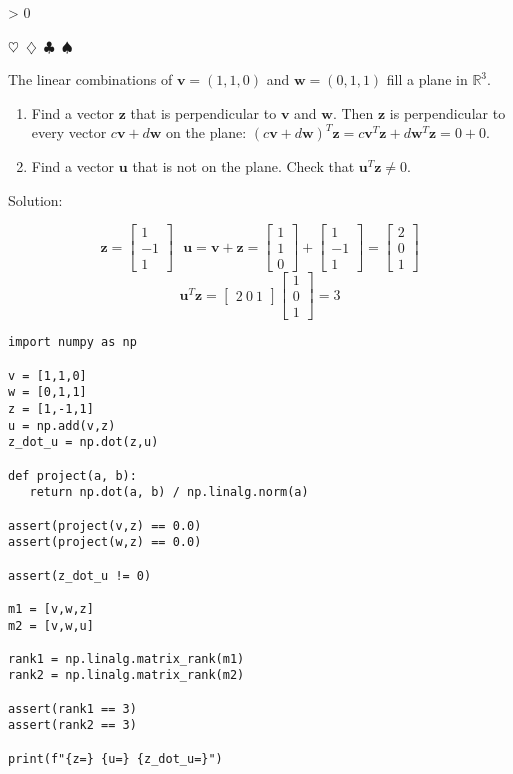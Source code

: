 \documentclass{article}
\newcommand{\sep}{\begin{center}$\heartsuit$~$\diamondsuit$~$\clubsuit$~$\spadesuit$\end{center}}
\newcommand{\sol}{\begin{center}\small{Solution:}\end{center}}
\newcommand{\vect}[1]{\ensuremath{\boldsymbol{#1}}}
\newcounter{prblm}
\newcommand{\problem}[1]{
  \begingroup
  \ifnum\value{prblm} > 0 \sep \fi
  \stepcounter{prblm}
  \noindent\textbf{\arabic{prblm}} #1
  \sol
  \endgroup
}
\begin{document}
\problem{The linear combinations of $\vect{v} = (1, 1, 0)$ and $\vect{w} = (0, 1, 1)$ fill a plane in $\mathbb{R}^3$.
\begin{enumerate}[label=(\alph*)]
\item Find a vector $\vect{z}$ that is perpendicular to $\vect{v}$ and $\vect{w}$. Then $\vect{z}$ is perpendicular to every vector $c\vect{v} + d\vect{w}$ on the plane: $(c\vect{v} + d\vect{w})^T \vect{z} = c\vect{v}^T\vect{z} + d\vect{w}^T\vect{z} = 0 + 0$. 
\item Find a vector $\vect{u}$ that is not on the plane. Check that $\vect{u}^T\vect{z} \not= 0$.
\end{enumerate}}


\begin{displaymath}
  \vect{z} = \begin{bmatrix} 1 \\ -1 \\ 1 \end{bmatrix}
  ~~~
  \vect{u} = \vect{v} + \vect{z} = \begin{bmatrix} 1 \\ 1 \\ 0 \end{bmatrix} + \begin{bmatrix} 1 \\ -1 \\ 1 \end{bmatrix} = \begin{bmatrix} 2 \\ 0 \\ 1 \end{bmatrix}
\end{displaymath}
\begin{displaymath}
  \vect{u}^T\vect{z} = \begin{bmatrix} 2 ~ 0 ~ 1 \end{bmatrix} \begin{bmatrix} 1 \\ 0 \\ 1 \end{bmatrix} = 3
\end{displaymath}

\begin{verbatim}
import numpy as np

v = [1,1,0]
w = [0,1,1]
z = [1,-1,1]
u = np.add(v,z)
z_dot_u = np.dot(z,u)

def project(a, b):
   return np.dot(a, b) / np.linalg.norm(a)

assert(project(v,z) == 0.0)
assert(project(w,z) == 0.0)

assert(z_dot_u != 0)

m1 = [v,w,z]
m2 = [v,w,u]

rank1 = np.linalg.matrix_rank(m1)
rank2 = np.linalg.matrix_rank(m2)

assert(rank1 == 3)
assert(rank2 == 3)

print(f"{z=} {u=} {z_dot_u=}")
\end{verbatim}
\end{document}
